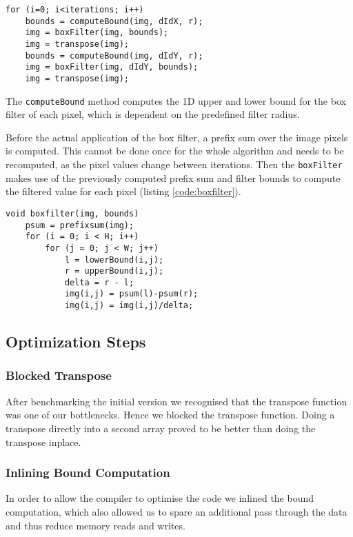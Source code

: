 \begin{lstlisting}[caption=Filterstep,label=code:filterstep]
for (i=0; i<iterations; i++)
    bounds = computeBound(img, dIdX, r);
    img = boxFilter(img, bounds);
    img = transpose(img);
    bounds = computeBound(img, dIdY, r);
    img = boxFilter(img, dIdY, bounds);
    img = transpose(img);
\end{lstlisting}

The \lstinline{computeBound} method computes the 1D upper and lower bound for the box filter of each pixel, which is dependent on the predefined filter radius. 

Before the actual application of the box filter, a prefix sum over the image pixels is computed. This cannot be done once for the whole algorithm and needs to be recomputed, as the pixel values change between iterations. Then the \lstinline{boxFilter} makes use of the previously computed prefix sum and filter bounds to compute the filtered value for each pixel (listing \ref{code:boxfilter}).

\begin{lstlisting}[caption=Boxfilter step, label=code:boxfilter]
void boxfilter(img, bounds) 
    psum = prefixsum(img);
    for (i = 0; i < H; i++) 
        for (j = 0; j < W; j++)
            l = lowerBound(i,j);
            r = upperBound(i,j);
            delta = r - l;
            img(i,j) = psum(l)-psum(r);
            img(i,j) = img(i,j)/delta;
\end{lstlisting}

\subsection{Optimization Steps}

\subsubsection{Blocked Transpose}

After benchmarking the initial version we recognised that the transpose function was one of our bottlenecks. Hence we blocked the transpose function. Doing a transpose directly into a second array proved to be better than doing the transpose inplace.

\subsubsection{Inlining Bound Computation}

In order to allow the compiler to optimise the code we inlined the bound computation, which also allowed us to spare an additional pass through the data and thus reduce memory reads and writes.

